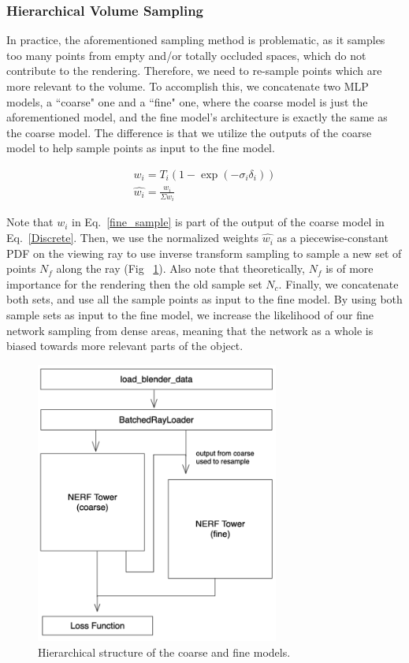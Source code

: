 \subsubsection{Hierarchical Volume Sampling}

In practice, the aforementioned sampling method is problematic, as it samples too many points from empty and/or totally occluded spaces, which do not contribute to the rendering. Therefore, we need to re-sample points which are more relevant to the volume. To accomplish this, we concatenate two MLP models, a ``coarse" one and a ``fine" one, where the coarse model is just the aforementioned model, and the fine model's architecture is exactly the same as the coarse model. The difference is that we utilize the outputs of the coarse model to help sample points as input to the fine model.

\begin{equation}
\begin{aligned}
w_i = T_i (1-\exp{(-\sigma_i \delta_i)}) \\
\hat{w_i}=\frac{w_i}{\Sigma w_i}
\end{aligned}
\label{fine_sample}
\end{equation}

Note that $w_i$ in Eq.~\ref{fine_sample} is part of the output of the coarse model in Eq.~\ref{Discrete}. Then, we use the normalized weights $\hat{w_i}$ as a piecewise-constant PDF on the viewing ray to use inverse transform sampling to sample a new set of points $N_f$ along the ray (Fig ~\ref{fine coarse}).  Also note that theoretically, $N_f$ is of more importance for the rendering then the old sample set $N_c$. Finally, we concatenate both sets, and use all the sample points as input to the fine model. By using both sample sets as input to the fine model, we increase the likelihood of our fine network sampling from dense areas, meaning that the network as a whole is biased towards more relevant parts of the object. 

\begin{figure}[h]
    \centering
    \includegraphics[width=80mm,scale=0.5]{images/train_arch.png}
    \caption{Hierarchical structure of the coarse and fine models.}
    \label{fine coarse}
\end{figure}



